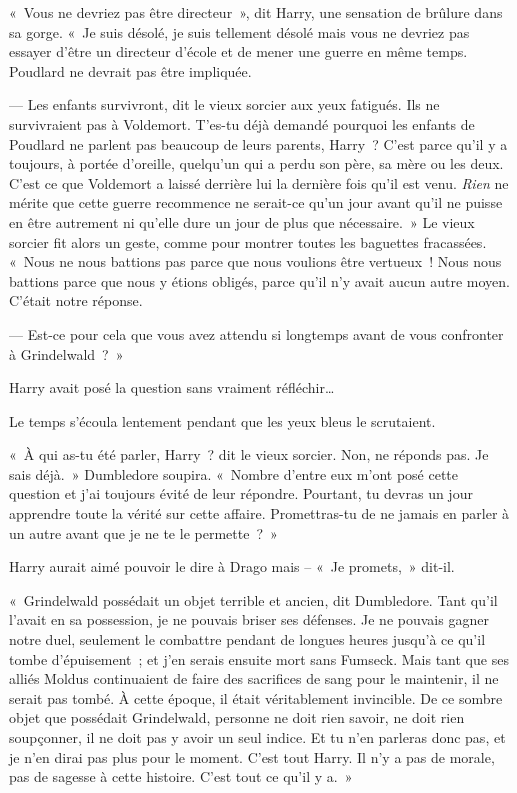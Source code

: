 «~Vous ne devriez pas être directeur~», dit Harry, une sensation de brûlure dans sa gorge. «~Je suis désolé, je suis tellement désolé mais vous ne devriez pas essayer d'être un directeur d'école et de mener une guerre en même temps. Poudlard ne devrait pas être impliquée.

--- Les enfants survivront, dit le vieux sorcier aux yeux fatigués. Ils ne survivraient pas à Voldemort. T'es-tu déjà demandé pourquoi les enfants de Poudlard ne parlent pas beaucoup de leurs parents, Harry~? C'est parce qu'il y a toujours, à portée d'oreille, quelqu'un qui a perdu son père, sa mère ou les deux. C'est ce que Voldemort a laissé derrière lui la dernière fois qu'il est venu. \emph{Rien} ne mérite que cette guerre recommence ne serait-ce qu'un jour avant qu'il ne puisse en être autrement ni qu'elle dure un jour de plus que nécessaire.~» Le vieux sorcier fit alors un geste, comme pour montrer toutes les baguettes fracassées. «~Nous ne nous battions pas parce que nous voulions être vertueux~! Nous nous battions parce que nous y étions obligés, parce qu'il n'y avait aucun autre moyen. C'était notre réponse.

--- Est-ce pour cela que vous avez attendu si longtemps avant de vous confronter à Grindelwald~?~»

Harry avait posé la question sans vraiment réfléchir…

Le temps s'écoula lentement pendant que les yeux bleus le scrutaient.

«~À qui as-tu été parler, Harry~? dit le vieux sorcier. Non, ne réponds pas. Je sais déjà.~» Dumbledore soupira. «~Nombre d'entre eux m'ont posé cette question et j'ai toujours évité de leur répondre. Pourtant, tu devras un jour apprendre toute la vérité sur cette affaire. Promettras-tu de ne jamais en parler à un autre avant que je ne te le permette~?~»

Harry aurait aimé pouvoir le dire à Drago mais -- «~Je promets,~» dit-il.

«~Grindelwald possédait un objet terrible et ancien, dit Dumbledore. Tant qu'il l'avait en sa possession, je ne pouvais briser ses défenses. Je ne pouvais gagner notre duel, seulement le combattre pendant de longues heures jusqu'à ce qu'il tombe d'épuisement~; et j'en serais ensuite mort sans Fumseck. Mais tant que ses alliés Moldus continuaient de faire des sacrifices de sang pour le maintenir, il ne serait pas tombé. À cette époque, il était véritablement invincible. De ce sombre objet que possédait Grindelwald, personne ne doit rien savoir, ne doit rien soupçonner, il ne doit pas y avoir un seul indice. Et tu n'en parleras donc pas, et je n'en dirai pas plus pour le moment. C'est tout Harry. Il n'y a pas de morale, pas de sagesse à cette histoire. C'est tout ce qu'il y a.~»

